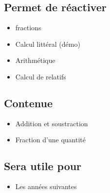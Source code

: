 \subsection{Permet de réactiver}
\begin{itemize}
    \item fractions
    \item Calcul littéral (démo)
    \item Arithmétique
    \item Calcul de relatifs
\end{itemize}

\subsection{Contenue}
\begin{itemize}
    \item Addition et soustraction
    \item Fraction d'une quantité
\end{itemize}

\subsection{Sera utile pour}
\begin{itemize}
    \item Les années suivantes
\end{itemize}